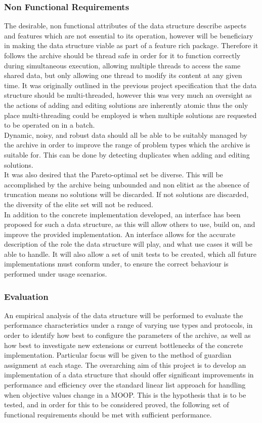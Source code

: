 \documentclass{ecmm427_assignment}
\begin{document}
\subsubsection{Non Functional Requirements}
The desirable, non functional attributes of the data structure describe aspects and features which are not essential to its operation, however will be beneficiary in making the data structure viable as part of a feature rich package. Therefore it follows the archive should be thread safe in order for it to function correctly during simultaneous execution, allowing multiple threads to access the same shared data, but only allowing one thread to modify its content at any given time. It was originally outlined in the previous project specification that the data structure should be multi-threaded, however this was very much an oversight as the actions of adding and editing solutions are inherently atomic thus the only place multi-threading could be employed is when multiple solutions are requested to be operated on in a batch.
\\Dynamic, noisy, and robust data should all be able to be suitably managed by the archive in order to improve the range of problem types which the archive is suitable for. This can be done by detecting duplicates when adding and editing solutions.
\\It was also desired that the Pareto-optimal set be diverse. This will be accomplished by the archive being unbounded and non elitist as the absence of truncation means no solutions will be discarded. If not solutions are discarded, the diversity of the elite set will not be reduced.
\\In addition to the concrete implementation developed, an interface has been proposed for such a  data structure, as this will allow others to use, build on, and improve the provided implementation. An interface allows for the accurate description of the role the data structure will play, and what use cases it will be able to handle. It will also allow a set of unit tests to be created, which all future implementations must conform under, to ensure the correct behaviour is performed under usage scenarios.

\subsubsection{Evaluation}
An empirical analysis of the data structure will be performed to evaluate the performance characteristics under a range of varying use types and protocols, in order to identify how best to configure the parameters of the archive, as well as how best to investigate new extensions or current bottlenecks of the concrete  implementation. Particular focus will be given to the method of guardian assignment at each stage. The overarching aim of this project is to develop an implementation of a data structure that should offer significant improvements in performance and efficiency over the standard linear list approach for handling when objective values change in a MOOP. This is the hypothesis that is to be tested, and in order for this to be considered proved, the following set of functional requirements should be met with sufficient performance.
\end{document}
